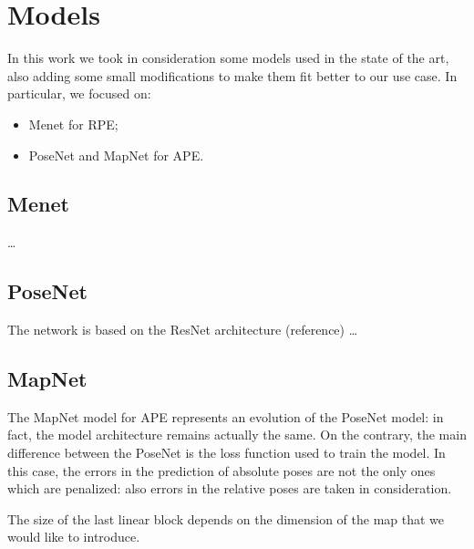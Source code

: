 \section{Models}
In this work we took in consideration some models used in the state of the art, also adding some small modifications to make them fit better to our use case.
In particular, we focused on:
\begin{itemize}
    \item Menet for RPE;
    \item PoseNet and MapNet for APE.
\end{itemize}

\subsection{Menet}
\dots

\subsection{PoseNet}
The network is based on the ResNet architecture (reference)
\dots

\subsection{MapNet}
The MapNet model for APE represents an evolution of the PoseNet model: in fact, the model architecture remains actually the same. On the contrary, the main difference between the PoseNet is the loss function used to train the model. In this case, the errors in the prediction of absolute poses are not the only ones which are penalized: also errors in the relative poses are taken in consideration.

The size of the last linear block depends on the dimension of the map that we would like to introduce.
